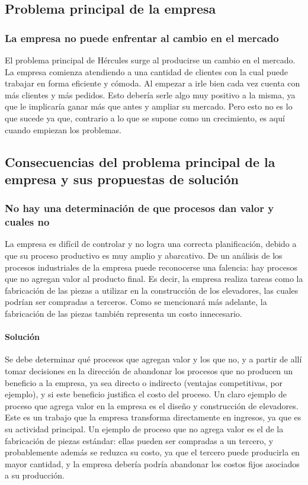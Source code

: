 \documentclass[12pt,a4paper,spanish]{article}
\begin{document}
\subsection{Problema principal de la empresa}
\subsubsection{La empresa no puede enfrentar al cambio en el mercado}
El problema principal de H\'ercules surge al producirse un cambio en el mercado. La empresa comienza atendiendo a una cantidad de clientes con la cual puede trabajar en forma eficiente y c\'omoda. Al empezar a irle bien cada vez cuenta con m\'as clientes y m\'as pedidos. Esto deber\'ia serle algo muy positivo a la misma, ya que le implicar\'ia ganar m\'as que antes y ampliar su mercado. Pero esto no es lo que sucede ya que, contrario a lo que se supone como un crecimiento, es aqu\'i cuando empiezan los problemas.\\

\subsection{Consecuencias del problema principal de la empresa y sus propuestas de soluci\'on}

\subsubsection{No hay una determinaci\'on de que procesos dan valor y cuales no}
La empresa es dif\'icil de controlar y no logra una correcta planificaci\'on, debido a que su proceso productivo es muy amplio y abarcativo. De un an\'alisis de los procesos industriales de la empresa puede reconocerse una falencia: hay procesos que no agregan valor al producto final. Es decir, la empresa realiza tareas como la fabricaci\'on de las piezas a utilizar en la construcci\'on de los elevadores, las cuales podr\'ian ser compradas a terceros. Como se mencionar\'a m\'as adelante, la fabricaci\'on de las piezas tambi\'en representa un costo innecesario.
\paragraph{Soluci\'on}
Se debe determinar qu\'e procesos que agregan valor y los que no, y a partir de all\'i tomar decisiones en la direcci\'on de abandonar los procesos que no producen un beneficio a la empresa, ya sea directo o indirecto (ventajas competitivas, por ejemplo), y si este beneficio justifica el costo del proceso. Un claro ejemplo de proceso que agrega valor en la empresa es el dise\~no y construcci\'on de elevadores. Este es un trabajo que la empresa transforma directamente en ingresos, ya que es su actividad principal. Un ejemplo de proceso que no agrega valor es el de la fabricaci\'on de piezas est\'andar: ellas pueden ser compradas a un tercero, y probablemente adem\'as se reduzca su costo, ya que el tercero puede producirla en mayor cantidad, y la empresa deber\'ia podr\'ia abandonar los costos fijos asociados a su producci\'on.
\end{document}
